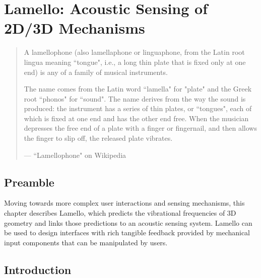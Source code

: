 \chapter{Lamello: Acoustic Sensing of 2D/3D Mechanisms}

\begin{quote}
A lamellophone (also lamellaphone or linguaphone, from the Latin root lingua meaning ``tongue", i.e., a long thin plate that is fixed only at one end) is any of a family of musical instruments.

The name comes from the Latin word ``lamella" for "plate" and the Greek root ``phonos" for ``sound". The name derives from the way the sound is produced: the instrument has a series of thin plates, or ``tongues", each of which is fixed at one end and has the other end free. When the musician depresses the free end of a plate with a finger or fingernail, and then allows the finger to slip off, the released plate vibrates.

--- ``Lamellophone" on Wikipedia
\end{quote}

\section{Preamble}
Moving towards more complex user interactions and sensing mechanisms, this chapter describes Lamello, which predicts the vibrational frequencies of 3D geometry and links those predictions to an acoustic sensing system. Lamello can be used to design interfaces with rich tangible feedback provided by mechanical input components that can be manipulated by users.


\section{Introduction}


